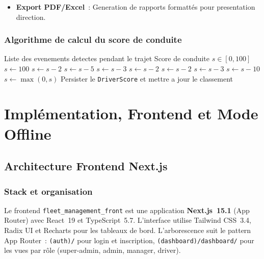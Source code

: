 \documentclass[12pt,a4paper]{report}
\begin{document}
\begin{enumerate}[leftmargin=2cm]
\begin{itemize}[leftmargin=2cm]
  \item \textbf{Export PDF/Excel}~: Generation de rapports formatt\'es pour
        presentation direction.
\end{itemize}

\section{Algorithme de calcul du score de conduite}

\begin{algorithm}[H]
\caption{Calcul du score de conduite apres un trajet}
\label{alg:scoring}
\begin{algorithmic}[1]
\Require Liste des evenements detectes pendant le trajet
\Ensure Score de conduite $s \in [0, 100]$
\State $s \gets 100$
   \State $s \gets s - 2$
   \State $s \gets s - 5$
   \State $s \gets s - 3$
   \State $s \gets s - 2$
   \State $s \gets s - 2$
   \State $s \gets s - 3$
   \State $s \gets s - 10$
  \EndIf
\EndFor
\State $s \gets \max(0, s)$
\State Persister le \texttt{DriverScore} et mettre a jour le classement
\end{algorithmic}
\end{algorithm}

\part{Implémentation, Frontend et Mode Offline}

\chapter{Architecture Frontend Next.js}

\section{Stack et organisation}

Le frontend \texttt{fleet\_management\_front} est une application
\textbf{Next.js~15.1} (App Router) avec React~19 et TypeScript~5.7.
L'interface utilise Tailwind CSS~3.4, Radix UI et Recharts pour les
tableaux de bord. L'arborescence suit le pattern App Router~:
\texttt{(auth)/} pour login et inscription,
\texttt{(dashboard)/dashboard/} pour les vues par rôle
(super-admin, admin, manager, driver).


\end{enumerate}
\end{document}
